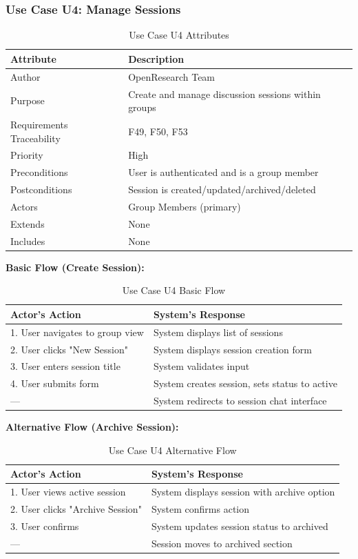 \documentclass[11pt,a4paper]{article}
\begin{document}
\subsubsection{Use Case U4: Manage Sessions}

\begin{table}[H]
\centering
\begin{tabular}{p{4cm}p{9cm}}
\toprule
\textbf{Attribute} & \textbf{Description} \\
\midrule
Author & OpenResearch Team \\
Purpose & Create and manage discussion sessions within groups \\
Requirements Traceability & F49, F50, F53 \\
Priority & High \\
Preconditions & User is authenticated and is a group member \\
Postconditions & Session is created/updated/archived/deleted \\
Actors & Group Members (primary) \\
Extends & None \\
Includes & None \\
\bottomrule
\end{tabular}
\caption{Use Case U4 Attributes}
\end{table}

\textbf{Basic Flow (Create Session):}

\begin{table}[H]
\centering
\begin{tabular}{p{6cm}p{7cm}}
\toprule
\textbf{Actor's Action} & \textbf{System's Response} \\
\midrule
1. User navigates to group view & System displays list of sessions \\
2. User clicks "New Session" & System displays session creation form \\
3. User enters session title & System validates input \\
4. User submits form & System creates session, sets status to active \\
--- & System redirects to session chat interface \\
\bottomrule
\end{tabular}
\caption{Use Case U4 Basic Flow}
\end{table}

\textbf{Alternative Flow (Archive Session):}

\begin{table}[H]
\centering
\begin{tabular}{p{6cm}p{7cm}}
\toprule
\textbf{Actor's Action} & \textbf{System's Response} \\
\midrule
1. User views active session & System displays session with archive option \\
2. User clicks "Archive Session" & System confirms action \\
3. User confirms & System updates session status to archived \\
--- & Session moves to archived section \\
\bottomrule
\end{tabular}
\caption{Use Case U4 Alternative Flow}
\end{table}
\end{document}
